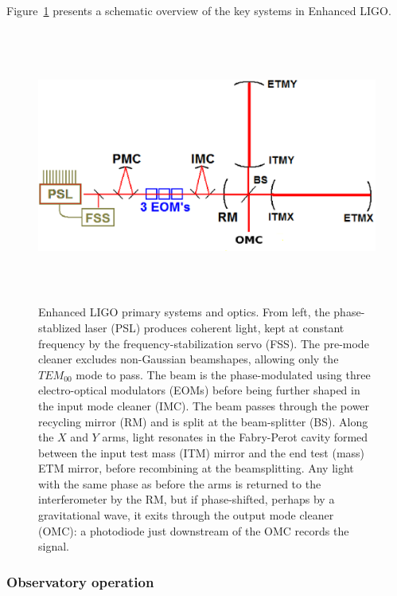 Figure~\ref{primary_eLIGO_optics} presents a schematic overview of the key systems in Enhanced LIGO.

\begin{figure}
\begin{center}
\includegraphics[height=90mm,width=148mm]{LIGODiagramnew.eps}
\caption{Enhanced LIGO primary systems and optics. From left, the phase-stablized laser (PSL) produces coherent light, kept at constant frequency by the frequency-stabilization servo (FSS). The pre-mode cleaner excludes non-Gaussian beamshapes, allowing only the $TEM_{00}$ mode to pass. The beam is the phase-modulated using three electro-optical modulators (EOMs) before being further shaped in the input mode cleaner (IMC). The beam passes through the power recycling mirror (RM) and is split at the beam-splitter (BS). Along the $X$ and $Y$ arms, light resonates in the Fabry-Perot cavity formed between the input test mass (ITM) mirror and the end test (mass) ETM mirror, before recombining at the beamsplitting. Any light with the same phase as before the arms is returned to the interferometer by the RM, but if phase-shifted, perhaps by a gravitational wave, it exits through the output mode cleaner (OMC): a photodiode just downstream of the OMC records the signal.}
\label{primary_eLIGO_optics}
\end{center}
\end{figure}

            \subsubsection{Observatory operation}
            \label{observatory_operation}

